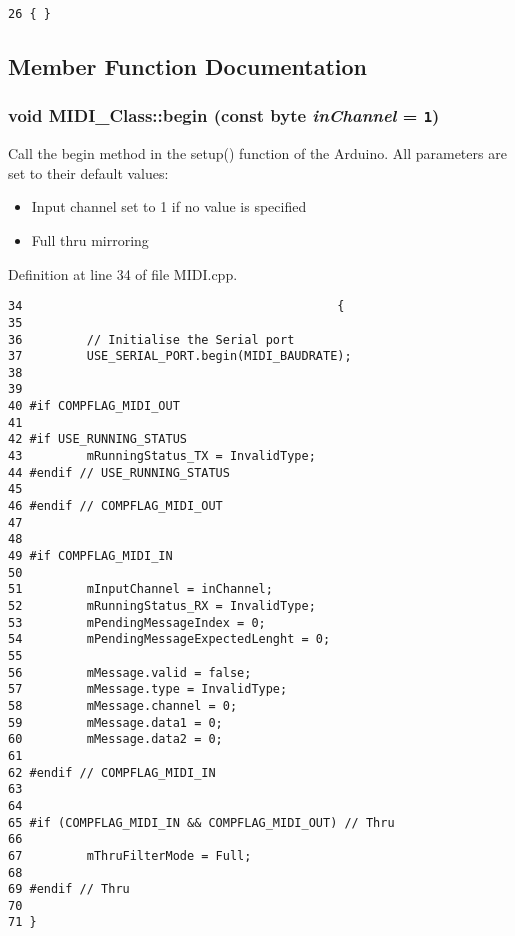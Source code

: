 \begin{Code}\begin{verbatim}26 { }
\end{verbatim}
\end{Code}




\subsection{Member Function Documentation}
\hypertarget{class_m_i_d_i___class_c34d163205bb01ac5e03df7e64facebe}{
\subsubsection[{begin}]{\setlength{\rightskip}{0pt plus 5cm}void MIDI\_\-Class::begin (const {\bf byte} {\em inChannel} = {\tt 1})}}
\label{class_m_i_d_i___class_c34d163205bb01ac5e03df7e64facebe}


Call the begin method in the setup() function of the Arduino. All parameters are set to their default values:\begin{itemize}
\item Input channel set to 1 if no value is specified\item Full thru mirroring \end{itemize}


Definition at line 34 of file MIDI.cpp.

\begin{Code}\begin{verbatim}34                                            {
35         
36         // Initialise the Serial port
37         USE_SERIAL_PORT.begin(MIDI_BAUDRATE);
38         
39         
40 #if COMPFLAG_MIDI_OUT
41         
42 #if USE_RUNNING_STATUS
43         mRunningStatus_TX = InvalidType;
44 #endif // USE_RUNNING_STATUS
45         
46 #endif // COMPFLAG_MIDI_OUT
47         
48         
49 #if COMPFLAG_MIDI_IN
50         
51         mInputChannel = inChannel;
52         mRunningStatus_RX = InvalidType;
53         mPendingMessageIndex = 0;
54         mPendingMessageExpectedLenght = 0;
55         
56         mMessage.valid = false;
57         mMessage.type = InvalidType;
58         mMessage.channel = 0;
59         mMessage.data1 = 0;
60         mMessage.data2 = 0;
61         
62 #endif // COMPFLAG_MIDI_IN
63         
64         
65 #if (COMPFLAG_MIDI_IN && COMPFLAG_MIDI_OUT) // Thru
66         
67         mThruFilterMode = Full;
68         
69 #endif // Thru
70         
71 }
\end{verbatim}
\end{Code}


